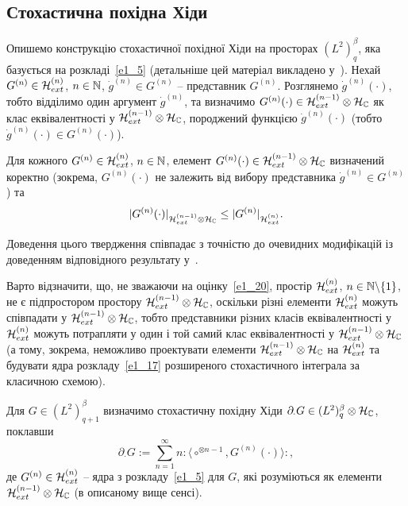 \subsection{Стохастична похідна Хіди}\label{S1_5}
Опишемо конструкцію стохастичної похідної Хіди на просторах $(L^2)^\beta_q$, яка базується
на розкладі~\eqref{e1_5} (детальніше цей матеріал викладено у~\cite{K13,K13_2}).
Нехай $G^{(n)}\in\mathcal{H}_{ext}^{(n)}$,
$n\in\mathbb{N}$, $\dot g^{(n)}\in G^{(n)}$ -- представник
$G^{(n)}$. Розглянемо $\dot g^{(n)}(\cdot)$, тобто відділимо один аргумент
$\dot g^{(n)}$, та визначимо $G^{(n)}(\cdot)\in\mathcal{H}_{ext}^{(n-1)}
\otimes\mathcal{H}_{\mathbb{C}}$ як клас еквівалентності у
$\mathcal{H}_{ext}^{(n-1)}\otimes\mathcal{H}_{\mathbb{C}}$, породжений функцією
$\dot g^{(n)}(\cdot)$ (тобто $\dot g^{(n)}(\cdot)\in G^{(n)}(\cdot)$).
\begin{sublemma}
Для кожного $G^{(n)}\in\mathcal{H}_{ext}^{(n)}$, $n\in\mathbb{N}$, елемент
$G^{(n)}(\cdot)\in\mathcal{H}_{ext}^{(n-1)}\otimes\mathcal{H}_{\mathbb{C}}$
визначений коректно (зокрема, $G^{(n)}(\cdot)$ не залежить від вибору представника
$\dot g^{(n)}\in G^{(n)}$) та
\begin{equation}\label{e1_20}
|G^{(n)}(\cdot)|_{\mathcal{H}_{ext}^{(n-1)}\otimes\mathcal{H}_{\mathbb{C}}}
\leq |G^{(n)}|_{\mathcal{H}_{ext}^{(n)}}.
\end{equation}
\end{sublemma}
Доведення цього твердження співпадає з точністю до очевидних модифікацій із
доведенням відповідного результату у~\cite{K13}.
\begin{subremark}\label{r1_5_1}
Варто відзначити, що, не зважаючи на оцінку~\eqref{e1_20}, простір
$\mathcal{H}_{ext}^{(n)}$, $n\in\mathbb{N}\backslash\{1\}$, не є підпростором простору
$\mathcal{H}_{ext}^{(n-1)}\otimes\mathcal{H}_{\mathbb{C}}$, оскільки різні елементи
$\mathcal{H}_{ext}^{(n)}$ можуть співпадати у
$\mathcal{H}_{ext}^{(n-1)}\otimes\mathcal{H}_{\mathbb{C}}$, тобто представники різних
класів еквівалентності у $\mathcal{H}_{ext}^{(n)}$ можуть потрапляти у один і той
самий клас еквівалентності у $\mathcal{H}_{ext}^{(n-1)}\otimes\mathcal{H}_{\mathbb{C}}$
(а тому, зокрема, неможливо проектувати елементи
$\mathcal{H}_{ext}^{(n-1)}\otimes\mathcal{H}_{\mathbb{C}}$ на $\mathcal{H}_{ext}^{(n)}$ та
будувати ядра розкладу~\eqref{e1_17} розширеного стохастичного інтеграла за класичною схемою).
\end{subremark}
\begin{subdefinition}
Для $G\in (L^2)^\beta_{q+1}$ визначимо стохастичну похідну Хіди
$\partial_\cdot G\in (L^2)^\beta_q\otimes\mathcal{H}_{\mathbb{C}}$, поклавши
\begin{equation}\label{e1_21}
\partial_\cdot G:=\sum_{n=1}^\infty n{:\!\langle}\circ^{\otimes n-1},G^{(n)}(\cdot){\rangle\!:},
\end{equation}
де $G^{(n)}\in\mathcal{H}_{ext}^{(n)}$ -- ядра з розкладу~\eqref{e1_5} для $G$, які розуміються
як елементи $\mathcal{H}_{ext}^{(n-1)}\otimes\mathcal{H}_{\mathbb{C}}$ (в описаному вище сенсі).
\end{subdefinition}
